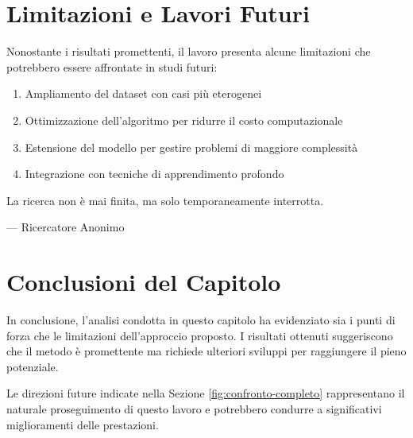 \section{Limitazioni e Lavori Futuri}

Nonostante i risultati promettenti, il lavoro presenta alcune limitazioni che potrebbero essere affrontate in studi futuri:

\begin{enumerate}
    \item Ampliamento del dataset con casi più eterogenei
    \item Ottimizzazione dell'algoritmo per ridurre il costo computazionale
    \item Estensione del modello per gestire problemi di maggiore complessità
    \item Integrazione con tecniche di apprendimento profondo
\end{enumerate}

\epigraph{La ricerca non è mai finita, ma solo temporaneamente interrotta.}{--- Ricercatore Anonimo}

\section{Conclusioni del Capitolo}

In conclusione, l'analisi condotta in questo capitolo ha evidenziato sia i punti di forza che le limitazioni dell'approccio proposto. I risultati ottenuti suggeriscono che il metodo è promettente ma richiede ulteriori sviluppi per raggiungere il pieno potenziale.

Le direzioni future indicate nella Sezione \ref{fig:confronto-completo} rappresentano il naturale proseguimento di questo lavoro e potrebbero condurre a significativi miglioramenti delle prestazioni.